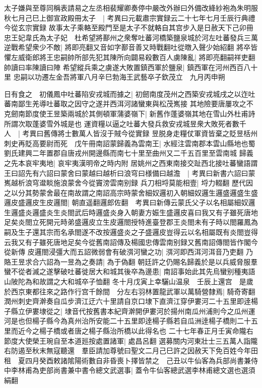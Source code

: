太子嫌與至尊同稱表請易之左丞相裴耀卿奏停中嚴改外辦曰外備改絳紗袍為朱明服秋七月己巳上御宣政殿冊太子　|{
	考異曰元載肅宗實録云二十七年七月壬辰行典禮今從玄宗實録}
故事太子乘輅至殿門至是太子不就輅自其宫步入是日赦天下己卯冊忠王妃韋氏為太子妃　杜希望將鄯州之衆奪吐蕃河橋築鹽泉城於河左吐蕃發兵三萬逆戰希望衆少不敵|{
	將即亮翻又音如字鄯音善又時戰翻吐從暾入聲少始紹翻}
將卒皆懼左威衛郎將王忠嗣帥所部先犯其陳所向闢易殺數百人虜陳亂|{
	將即亮翻嗣祥吏翻帥讀曰率陳讀曰陣}
希望縱兵乘之虜遂大敗置鎮西軍於鹽泉|{
	鎮西軍在河州西百八十里}
忠嗣以功遷左金吾將軍八月辛巳勃海王武藝卒子欽茂立　九月丙申朔

日有食之　初儀鳳中吐蕃陷安戎城而據之|{
	初劒南度茂州之西築安戎城戌之以迮吐蕃南鄙生羌導吐蕃取之因守之遂并西洱河諸蠻東與松茂嶲接}
其地險要唐屢攻之不克劒南節度使王昱築兩城於其側頓軍蒲婆嶺下|{
	新舊作蓬婆嶺其地在雪山外杜甫詩所謂次取蓬婆雪外城是也}
運資糧以逼之吐蕃大發兵救安戎城昱衆大敗死者數千人　|{
	考異曰舊傳將士數萬人皆沒于賊今從實録}
昱脱身走糧仗軍資皆棄之貶昱栝州刺史再貶高要尉而死　戊午冊南詔蒙歸義為雲南王|{
	水經注雲南郡本雲山縣地也蜀劉氏建興二年置郡自唐戎州開邊縣而南七十里至曲州又二千五百里至雲南城}
歸義之先本哀牢夷地|{
	哀牢夷漢明帝之時内附}
居姚州之西東南接交趾西北接吐蕃蠻語謂王曰詔先有六詔曰蒙舍曰蒙越曰越析曰浪穹曰様備曰越澹　|{
	考異曰新書六詔曰蒙嶲越析浪穹邆睒施浪蒙舍今從竇滂雲南别録}
兵刀相埒莫能相壹|{
	埒力輟翻}
歷代因之以分其勢蒙舍最在南故謂之南詔高宗時蒙舍細奴邏初入朝細奴邏生邏盛邏盛生盛邏皮盛邏皮生皮邏閤|{
	朝直遥翻邏郎佐翻　考異曰新傳云蒙氏父子以名相屬細奴邏生邏盛炎邏盛炎生炎閤武后時邏盛炎身入朝妻方娠生盛邏皮喜曰我又有子雖死唐地足矣炎閤立死開元時弟盛邏皮立生皮邏閤授特進臺登郡王炎閤未有子時以閤羅鳳為嗣及生子還其宗而名承閤遂不改按邏盛炎之子盛邏皮豈得云以名相屬既有炎閤豈得云我又有子雖死唐地足矣今從舊南詔傳及楊國忠傳雲南别録又舊南詔傳閤皆作閣今從新傳}
皮邏閤浸彊大而五詔微弱會有破渳河蠻之功|{
	渳河即西洱河洱音乃吏翻}
乃賂王昱求合六詔為一昱為之奏請|{
	為于偽翻}
朝廷許之仍賜名歸義於是以兵威脅服羣蠻不從者滅之遂擊破吐蕃徙居大和城其後卒為邊患|{
	南詔事始此其先烏蠻别種夷語山陂陀為和故謂之大和城卒子恤翻}
冬十月戊寅上幸驪山温泉　壬辰上還宫　是歲於西京東都往來之路作行宫千餘間　分左右羽林置龍武軍以萬騎營隸焉|{
	騎奇寄翻}
潤州刺史齊澣奏自瓜步濟江迂六十里請自京口埭下直濟江穿伊婁河二十五里即逹楊子縣立伊婁埭從之|{
	埭音代按舊書本紀齊澣開伊婁河於揚州南瓜州浦則今之瓜州運河是也但楊子縣今為真州治所安能二十五里即逹楊子縣若自瓜洲逹楊子橋則二十五里而近今之楊子橋或者唐之楊子縣治所橋以此得名也}
二十七年春正月壬寅命隴右節度大使榮王琬自至本道廵按處置諸軍|{
	處昌呂翻}
選募關内河東壯士三五萬人詣隴右防遏至秋末無寇聽還　羣臣請加尊號曰聖文二月己巳許之因赦天下免百姓今年田租　夏四月癸酉敕諸隂陽術數自非昏喪卜擇皆禁之　己丑以牛仙客為兵部尚書兼侍中李林甫為吏部尚書兼中書令總文武選事|{
	蓋令牛仙客總武選李林甫總文選也選須絹翻}
